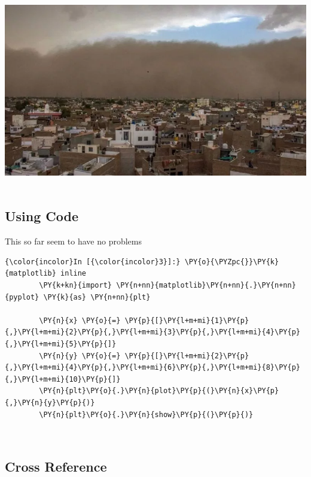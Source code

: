 \documentclass[float=false,crop=false]{standalone}
\begin{document}
    \includegraphics{ipy_sample_files/attach_5_image.png} ~

    \subsection{Using Code}\label{using-code}

This so far seem to have no problems

   \begin{Verbatim}[commandchars=\\\{\},fontsize=\scriptsize]
{\color{incolor}In [{\color{incolor}3}]:} \PY{o}{\PYZpc{}}\PY{k}{matplotlib} inline
        \PY{k+kn}{import} \PY{n+nn}{matplotlib}\PY{n+nn}{.}\PY{n+nn}{pyplot} \PY{k}{as} \PY{n+nn}{plt}
        
        \PY{n}{x} \PY{o}{=} \PY{p}{[}\PY{l+m+mi}{1}\PY{p}{,}\PY{l+m+mi}{2}\PY{p}{,}\PY{l+m+mi}{3}\PY{p}{,}\PY{l+m+mi}{4}\PY{p}{,}\PY{l+m+mi}{5}\PY{p}{]}
        \PY{n}{y} \PY{o}{=} \PY{p}{[}\PY{l+m+mi}{2}\PY{p}{,}\PY{l+m+mi}{4}\PY{p}{,}\PY{l+m+mi}{6}\PY{p}{,}\PY{l+m+mi}{8}\PY{p}{,}\PY{l+m+mi}{10}\PY{p}{]}
        \PY{n}{plt}\PY{o}{.}\PY{n}{plot}\PY{p}{(}\PY{n}{x}\PY{p}{,}\PY{n}{y}\PY{p}{)}
        \PY{n}{plt}\PY{o}{.}\PY{n}{show}\PY{p}{(}\PY{p}{)}
\end{Verbatim}

    \begin{center}
    \end{center}
    { \hspace*{\fill} \\}
    
    \subsection{Cross Reference}\label{cross-reference}
\end{document}
